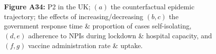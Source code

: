 \documentclass[paper=a4,fontsize=11pt]{article}
\begin{document}
\begin{figure}[!h]
  \\
  \hspace{1.76cm}
  \\
  \caption*{\textbf{Figure A34:} P2 in the UK; $(a)$ the counterfactual epidemic trajectory; the effects of increasing/decreasing $(b,c)$ the government response time \& proportion of cases self-isolating, $(d,e)$ adherence to NPIs during lockdown \& hospital capacity, and $(f,g)$ vaccine administration rate \& uptake.}
\end{figure}
\end{document}
